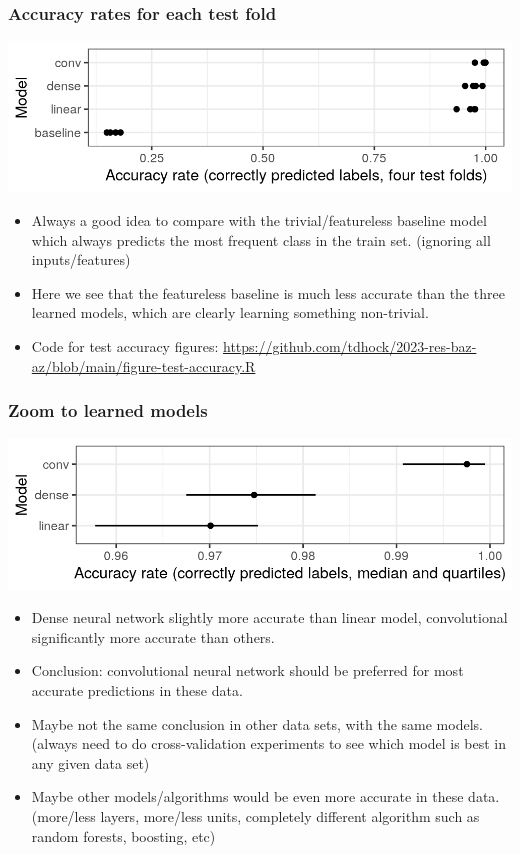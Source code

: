 \documentclass{beamer}
\begin{document}
\begin{frame}
  \frametitle{Accuracy rates for each test fold}
  \includegraphics[width=\textwidth]{figure-test-accuracy-baseline}

  \begin{itemize}
  \item Always a good idea to compare with the trivial/featureless baseline model which always
    predicts the most frequent class in the train set. (ignoring all
    inputs/features) 
  \item Here we see that the featureless baseline is much less accurate than the
    three learned models, which are clearly learning something non-trivial.
  \item Code for test accuracy figures:
    \url{https://github.com/tdhock/2023-res-baz-az/blob/main/figure-test-accuracy.R}
  \end{itemize}
\end{frame}
 
\begin{frame}
  \frametitle{Zoom to learned models}
  \includegraphics[width=\textwidth]{figure-test-accuracy}
  \begin{itemize}
  \item Dense neural network slightly more accurate
    than linear model, convolutional significantly more
    accurate than others.
  \item Conclusion: convolutional neural network should be preferred
    for most accurate predictions in these data.
  \item Maybe not the same conclusion in other data sets, with the
    same models. (always need to do cross-validation experiments to
    see which model is best in any given data set)
  \item Maybe other models/algorithms would be even more accurate in
    these data. (more/less layers, more/less units, completely
    different algorithm such as random forests, boosting, etc)
  \end{itemize}
\end{frame}
\end{document}
